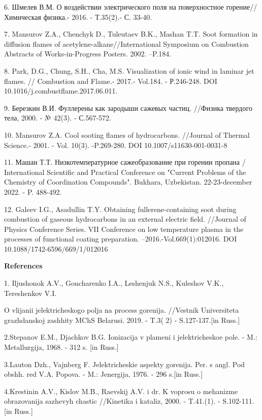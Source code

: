 6. Шмелев В.М. О воздействии электрического поля на поверхностное
горение//Химическая физика.- 2016. - Т.35(2).- С. 33-40.

7. Mansurov Z.A., Chenchyk D., Tuleutaev B.K., Mashan T.T. Soot
formation in diffusion flames of acetylene-alkane//International
Symposium on Combustion Abstracts of Works-in-Progress Posters. 2002.
--P.184.

8. Park, D.G., Chung, S.H., Cha, M.S. Visualization of ionic wind in
laminar jet flames. // Combustion and Flame.- 2017.- Vol.184. -
Р.246-248. DOI 10.1016/j.combustflame.2017.06.011.

9. Березкин В.И. Фуллерены как зародыши сажевых частиц. //Физика
твердого тела, 2000. - № 42(3). - С.567-572.

10. Mansurov Z.A. Cool sooting flames of hydrocarbons. //Journal of
Thermal Science.- 2001. - Vol. 10(3). -P.269-280. DOI
10.1007/s11630-001-0031-8

11. Машан Т.Т. Низкотемпературное сажеобразование при горении пропана /
International Scientific and Practical Conference on "Current Problems
of the Chemistry of Coordination Compounds". Bukhara, Uzbekistan.
22-23-december 2022. - P. 488-492.

12. Galeev I.G., Asadullin T.Y. Obtaining fullerene-containing soot
during combustion of gaseous hydrocarbons in an external electric field.
//Journal of Physics Conference Series. VII Conference on low
temperature plasma in the processes of functional coating preparation.
--2016.-Vol.669(1):012016. DOI 10.1088/1742-6596/669/1/012016

{\bfseries References}

1. Il\textquotesingle jushonok A.V., Goncharenko I.A., Leshenjuk N.S.,
Kuleshov V.K., Tereshenkov V.I.

O vlijanii jelektricheskogo polja na process gorenija. //Vestnik
Universiteta grazhdanskoj zashhity MChS Belarusi. 2019. - T.3( 2) -
S.127-137.{[}in Russ.{]}

2.Stepanov E.M., D\textquotesingle jachkov B.G. Ionizacija v plameni i
jelektricheskoe pole. - M.: Metallurgija, 1968. - 312 s. {[}in Russ.{]}

3.Lauton Dzh., Vajnberg F. Jelektricheskie aspekty gorenija. Per. s
angl. Pod obshh. red V.A. Popova. - M.: Jenergija, 1976. - 296 s.{[}in
Russ.{]}

4.Krestinin A.V., Kislov M.B., Raevskij A.V. i dr. K voprosu o mehanizme
obrazovanija sazhevyh chastic //Kinetika i kataliz, 2000. - T.41.(1). -
S.102-111. {[}in Russ.{]}

